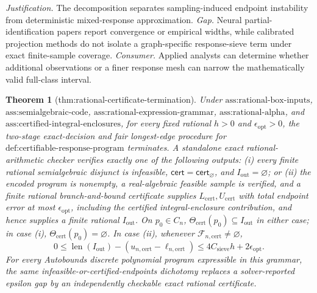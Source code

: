 \documentclass{article}
\newtheorem{theorem}{Theorem}
\begin{document}
\par\smallskip\noindent \textit{Justification.} The decomposition separates sampling-induced endpoint instability from deterministic mixed-response approximation. \textit{Gap.} Neural partial-identification papers report convergence or empirical widths, while calibrated projection methods do not isolate a graph-specific response-sieve term under exact finite-sample coverage. \textit{Consumer.} Applied analysts can determine whether additional observations or a finer response mesh can narrow the mathematically valid full-class interval.

\begin{theorem}[thm:rational-certificate-termination]\label{thm:rational-certificate-termination}
Under \(\text{ass:rational-box-inputs}\), \(\text{ass:semialgebraic-code}\), \(\text{ass:rational-expression-grammar}\), \(\text{ass:rational-alpha}\), and \(\text{ass:certified-integral-enclosures}\), for every fixed rational \(h>0\) and \(\epsilon_{\mathrm{opt}}>0\), the two-stage exact-decision and fair longest-edge procedure for \(\text{def:certifiable-response-program}\) terminates.  A standalone exact rational-arithmetic checker verifies exactly one of the following outputs: (i) every finite rational semialgebraic disjunct is infeasible, \(\mathsf{cert}=\mathsf{cert}_{\varnothing}\), and \(I_{\mathrm{out}}=\varnothing\); or (ii) the encoded program is nonempty, a real-algebraic feasible sample is verified, and a finite rational branch-and-bound certificate supplies \(L_{\mathrm{cert}},U_{\mathrm{cert}}\) with total endpoint error at most \(\epsilon_{\mathrm{opt}}\), including the certified integral-enclosure contribution, and hence supplies a finite rational \(I_{\mathrm{out}}\).  On \(p_0\in C_n\), \(\Theta_{\mathrm{cert}}(p_0)\subseteq I_{\mathrm{out}}\) in either case; in case (i), \(\Theta_{\mathrm{cert}}(p_0)=\varnothing\).  In case (ii), whenever \(\mathcal F_{n,\mathrm{cert}}\ne\varnothing\),
\[
0\leq\operatorname{len}(I_{\mathrm{out}})-(u_{n,\mathrm{cert}}-\ell_{n,\mathrm{cert}})
\leq4C_{\mathrm{sieve}}h+2\epsilon_{\mathrm{opt}}.
\]
For every Autobounds discrete polynomial program expressible in this grammar, the same infeasible-or-certified-endpoints dichotomy replaces a solver-reported epsilon gap by an independently checkable exact rational certificate.
\end{theorem}
\end{document}
